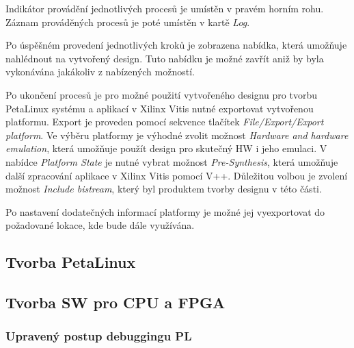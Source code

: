 \documentclass[a4paper, twoside, 11pt]{article}
\newcommand{\fbar}{\FloatBarrier}
\begin{document}
		Indikátor provádění jednotlivých procesů je umístěn v pravém horním rohu. Záznam prováděných procesů je poté umístěn v kartě \textit{Log}.\par
		Po úspěšném provedení jednotlivých kroků je zobrazena nabídka, která umožňuje nahlédnout na vytvořený design. Tuto nabídku je možné zavřít aniž by byla vykonávána jakákoliv z nabízených možností.\par
		Po ukončení procesů je pro možné použití vytvořeného designu pro tvorbu PetaLinux systému a aplikací v Xilinx Vitis nutné exportovat vytvořenou platformu. Export je proveden pomocí sekvence tlačítek \textit{File/Export/Export platform}. Ve výběru platformy je výhodné zvolit možnost \textit{Hardware and hardware emulation}, která umožňuje použít design pro skutečný HW i jeho emulaci. V nabídce \textit{Platform State} je nutné vybrat možnost \textit{Pre-Synthesis}, která umožňuje další zpracování aplikace v Xilinx Vitis pomocí V++. Důležitou volbou je zvolení možnost \textit{Include bistream}, který byl produktem tvorby designu v této části.\par
		Po nastavení dodatečných informací platformy je možné jej vyexportovat do požadované lokace, kde bude dále využívána.



	\fbar
	\subsection{Tvorba PetaLinux}
	\subsection{Tvorba SW pro CPU a FPGA}
	\subsubsection{Upravený postup debuggingu PL}
\end{document}
